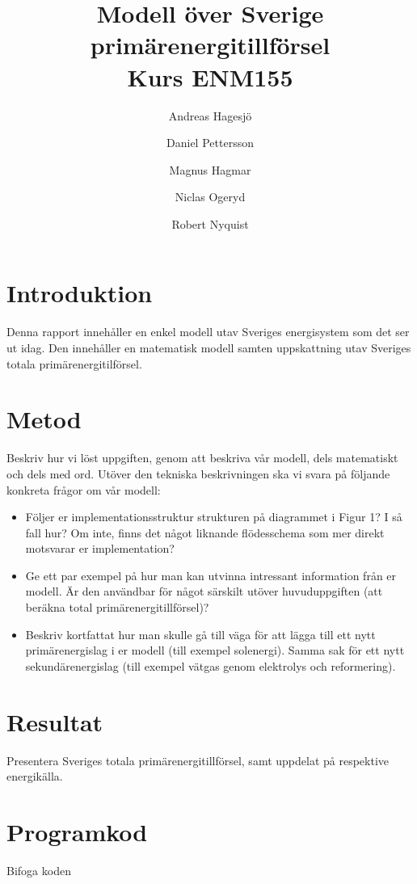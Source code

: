 \documentclass[a4paper,11pt,fleqn]{article}
\author{Andreas Hagesjö \and Daniel Pettersson \and
Magnus Hagmar \and Niclas Ogeryd \and Robert Nyquist}
\title{Modell över Sverige primärenergitillförsel \\ Kurs ENM155}
\begin{document}
\maketitle

\section{Introduktion}
Denna rapport innehåller en enkel modell utav Sveriges energisystem som det ser ut idag.
Den innehåller en matematisk modell samten uppskattning utav Sveriges totala primärenergitilförsel.


\section{Metod}
Beskriv hur vi löst uppgiften, genom att beskriva vår modell, dels
matematiskt och dels med ord. Utöver den tekniska beskrivningen ska vi
svara på följande konkreta frågor om vår modell:

\begin{itemize}
\item Följer er implementationsstruktur strukturen på diagrammet i Figur 1?
I så fall hur? Om inte, finns det något liknande flödesschema som mer
direkt motsvarar er implementation?

\item Ge ett par exempel på hur man kan utvinna intressant information från
er modell. Är den användbar för något särskilt utöver huvuduppgiften (att
beräkna total primärenergitillförsel)?

\item Beskriv kortfattat hur man skulle gå till väga för att lägga till ett
nytt primärenergislag i er modell (till exempel solenergi). Samma sak för
ett nytt sekundärenergislag (till exempel vätgas genom elektrolys och
reformering).
\end{itemize}

\section{Resultat}
Presentera Sveriges totala primärenergitillförsel, samt uppdelat på
respektive energikälla.

\appendix
\section{Programkod}
Bifoga koden
\end{document}
